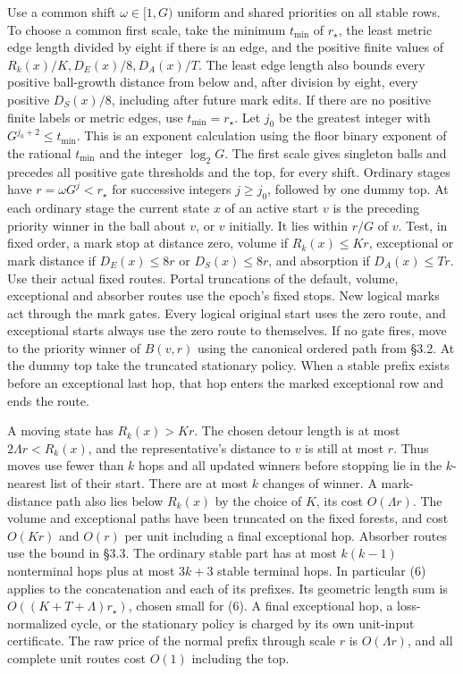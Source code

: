 \documentclass[11pt]{article}
\begin{document}
Use a common shift \(\omega\in[1,G)\) uniform and shared priorities on all stable rows. To choose a common first scale, take the minimum \(t_{\min}\) of \(r_\star\), the least metric edge length divided by eight if there is an edge, and the positive finite values of \(R_k(x)/K,D_E(x)/8,D_A(x)/T\). The least edge length also bounds every positive ball-growth distance from below and, after division by eight, every positive \(D_S(x)/8\), including after future mark edits. If there are no positive finite labels or metric edges, use \(t_{\min}=r_\star\). Let \(j_0\) be the greatest integer with \(G^{j_0+2}\le t_{\min}\). This is an exponent calculation using the floor binary exponent of the rational \(t_{\min}\) and the integer \(\log_2 G\). The first scale gives singleton balls and precedes all positive gate thresholds and the top, for every shift. Ordinary stages have \(r=\omega G^j<r_\star\) for successive integers \(j\ge j_0\), followed by one dummy top. At each ordinary stage the current state \(x\) of an active start \(v\) is the preceding priority winner in the ball about \(v\), or \(v\) initially. It lies within \(r/G\) of \(v\). Test, in fixed order, a mark stop at distance zero, volume if \(R_k(x)\le K r\), exceptional or mark distance if \(D_E(x)\le8r\) or \(D_S(x)\le8r\), and absorption if \(D_A(x)\le T r\). Use their actual fixed routes. Portal truncations of the default, volume, exceptional and absorber routes use the epoch's fixed stops. New logical marks act through the mark gates. Every logical original start uses the zero route, and exceptional starts always use the zero route to themselves. If no gate fires, move to the priority winner of \(B(v,r)\) using the canonical ordered path from §3.2. At the dummy top take the truncated stationary policy. When a stable prefix exists before an exceptional last hop, that hop enters the marked exceptional row and ends the route.

A moving state has \(R_k(x)>K r\). The chosen detour length is at most \(2\Lambda r<R_k(x)\), and the representative's distance to \(v\) is still at most \(r\). Thus moves use fewer than \(k\) hops and all updated winners before stopping lie in the \(k\)-nearest list of their start. There are at most \(k\) changes of winner. A mark-distance path also lies below \(R_k(x)\) by the choice of \(K\), its cost \(O(\Lambda r)\). The volume and exceptional paths have been truncated on the fixed forests, and cost \(O(Kr)\) and \(O(r)\) per unit including a final exceptional hop. Absorber routes use the bound in §3.3. The ordinary stable part has at most \(k(k-1)\) nonterminal hops plus at most \(3k+3\) stable terminal hops. In particular (6) applies to the concatenation and each of its prefixes. Its geometric length sum is \(O((K+T+\Lambda)r_\star)\), chosen small for (6). A final exceptional hop, a loss-normalized cycle, or the stationary policy is charged by its own unit-input certificate. The raw price of the normal prefix through scale \(r\) is \(O(\Lambda r)\), and all complete unit routes cost \(O(1)\) including the top.
\end{document}
